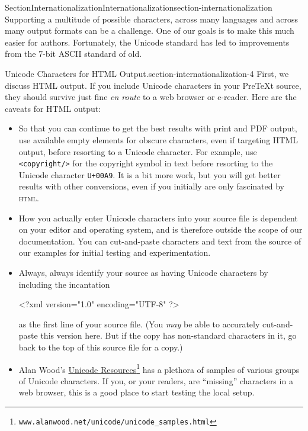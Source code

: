 \documentclass[twoside,10pt,]{article}
\newcommand{\mono}[1]{\texttt{#1}}
\newcommand{\initialism}[1]{\textsc{\MakeLowercase{#1}}}
\numberwithin{equation}{section}
\begin{document}
\typeout{************************************************}
%
\begin{sectionptx}{Section}{Internationalization}{}{Internationalization}{}{}{section-internationalization}
%
Supporting a multitude of possible characters, across many languages and across many output formats can be a challenge.  One of our goals is to make this much easier for authors.  Fortunately, the Unicode standard has led to improvements from the 7-bit ASCII standard of old.%
\begin{paragraphs}{Unicode Characters for HTML Output.}{section-internationalization-4}%
First, we discuss HTML output.  If you include Unicode characters in your PreTeXt source, they should survive just fine \textit{en route} to a web browser or e-reader.  Here are the caveats for HTML output:%
\begin{itemize}[label=\textbullet]
\item{}So that you can continue to get the best results with print and PDF output, use available empty elements for obscure characters, even if targeting HTML output, before resorting to a Unicode character.  For example, use \mono{<copyright/>} for the copyright symbol in text before resorting to the Unicode character \mono{U+00A9}.  It is a bit more work, but you will get better results with other conversions, even if you initially are only fascinated by \initialism{HTML}.%
\item{}How you actually enter Unicode characters into your source file is dependent on your editor and operating system, and is therefore outside the scope of our documentation.  You can cut-and-paste characters and text from the source of our examples for initial testing and experimentation.%
\item{}Always, always identify your source as having Unicode characters by including the incantation%
\begin{codedisplay}
<?xml version="1.0" encoding="UTF-8" ?>
\end{codedisplay}
as the first line of your source file. (You \emph{may} be able to accurately cut-and-paste this version here.  But if the copy has non-standard characters in it, go back to the top of this source file for a copy.)%
\item{}Alan Wood’s \href{http://www.alanwood.net/unicode/unicode_samples.html}{Unicode Resources}\footnote{\nolinkurl{www.alanwood.net/unicode/unicode_samples.html}\label{section-internationalization-4-2-4-4-1-2}} has a plethora of samples of various groups of Unicode characters.  If you, or your readers, are ``missing'' characters in a web browser, this is a good place to start testing the local setup.%

\end{itemize}
\end{paragraphs}
\end{sectionptx}
\end{document}
